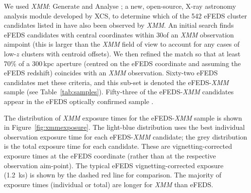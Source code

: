 \documentclass[fleqn,usenatbib]{mnras}
\begin{document}
We used {\em XMM}: Generate and Analyse \citep[\texttt{XGA}\footnote{\href{https://github.com/DavidT3/XGA}{{\em XMM}: Generate and Analyse GitHub}}][]{xgapaper}; a new, open-source, X-ray astronomy analysis module developed by XCS, to determine which of the 542 eFEDS cluster candidates listed in \cite{efedsclustercat} have also been observed by {\em XMM}.
An initial search finds eFEDS candidates with central coordinates within 30\arcmin of an {\em XMM} observation aimpoint (this is larger than the {\em XMM} field of view to account for any cases of low-$z$ clusters with centroid offsets). We then refined the match so that at least 70\% of a 300\,kpc aperture (centred on the eFEDS coordinate and assuming the eFEDS redshift) coincides with an {\em XMM} observation. Sixty-two eFEDS candidates met these criteria, and this sub-set is denoted the eFEDS-{\em XMM} sample (see Table~\ref{tab:samples}). Fifty-three of the eFEDS-{\em XMM} candidates appear in the eFEDS optically confirmed sample \citep[][]{efedsclusteropticalcat}.


The distribution of {\em XMM} exposure times for the eFEDS-{\em XMM} sample is shown in Figure~\ref{fig:xmmexposure}. The light-blue distribution uses the best individual observation exposure time for each eFEDS-{\em XMM} candidate; the grey distribution is the total exposure time for each candidate. These are vignetting-corrected exposure times at the eFEDS coordinate (rather than at the respective observation aim-point). The typical eFEDS vignetting-corrected exposure (1.2~ks) is shown by the dashed red line for comparison. The majority of exposure times (individual or total) are longer for {\em XMM} than eFEDS.

\end{document}
